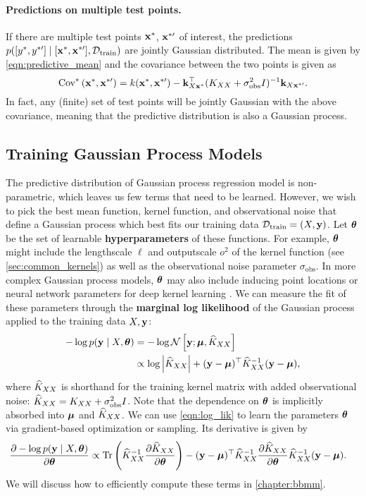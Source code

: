 \paragraph{Predictions on multiple test points.}
If there are multiple test points $\mathbf{x}^*$, $\mathbf{x}^{*\prime}$ of interest, the predictions $p([y^*, y^{*\prime}] \mid [\mathbf{x}^*, \mathbf{x}^{*\prime}], \mathcal D_\text{train})$ are jointly Gaussian distributed.
The mean is given by \cref{eqn:predictive_mean} and the covariance between the two points is given as
\[ \text{Cov}^* \left( \mathbf{x}^*, \mathbf{x}^{*\prime} \right) = k(\mathbf{x}^*, \mathbf{x}^{*\prime}) - \mathbf{k}_{X\mathbf{x}^*}^\top ( K_{XX} + \sigma_\text{obs}^2 I )^{-1} \mathbf{k}_{X\mathbf{x}^{*\prime}}. \]
In fact, any (finite) set of test points will be jointly Gaussian with the above covariance, meaning that the predictive distribution is also a Gaussian process.

\subsection{Training Gaussian Process Models}
\label{sec:gp_training}

The predictive distribution of Gaussian process regression model is non-parametric, which leaves us few terms that need to be learned.
However, we wish to pick the best mean function, kernel function, and observational noise that define a Gaussian process which best fits our training data $\mathcal D_\text{train} = (X, \mathbf{y})$.
Let $\boldsymbol{\theta}$ be the set of learnable {\bf hyperparameters} of these functions.
For example, $\boldsymbol{\theta}$ might include the lengthscale $\ell$ and outputscale $o^2$ of the kernel function (see \cref{sec:common_kernels}) as well as the observational noise parameter $\sigma_\text{obs}$.
In more complex Gaussian process models, $\boldsymbol{\theta}$ may also include inducing point locations \cite{titsias2009variational} or neural network parameters for deep kernel learning \cite{wilson2016deep}.
We can measure the fit of these parameters through the {\bf marginal log likelihood} of the Gaussian process applied to the training data $X, \mathbf{y}$:
%
\begin{align}
  -\log p( \by \mid \bX, \btheta)
  &= -\log \normaldist{ \by ; \bmu }{ \trainK }
  \nonumber{} \\
  &\propto \log \left \vert \trainK \right \vert + (\by - \bmu)^{\top} \trainK^{-1} (\by - \bmu),
  \label{eqn:log_lik}
\end{align}
%
where $\widehat{K}_{XX}$ is shorthand for the training kernel matrix with added observational noise: $\widehat{K}_{XX} = K_{XX} + \sigma_\text{obs}^2 I$.
Note that the dependence on $\boldsymbol{\theta}$ is implicitly absorbed into $\boldsymbol{\mu}$ and $\widehat{K}_{XX}$.
We can use \cref{eqn:log_lik} to learn the parameters $\boldsymbol{\theta}$ via gradient-based optimization or sampling.
Its derivative is given by
%
\begin{align}
  \frac{\partial - \log p( \by \mid \bX, \btheta )}{\partial \btheta} &\propto
   \tr{\trainK^{-1}\frac{\partial \trainK}{\partial \btheta}} -
	 (\by - \bmu)^{\top} \trainK^{-1}\frac{\partial \trainK}{\partial \btheta}\trainK^{-1} (\by - \bmu).
  \label{eqn:log_lik_deriv}
\end{align}
%
We will discuss how to efficiently compute these terms in \cref{chapter:bbmm}.

